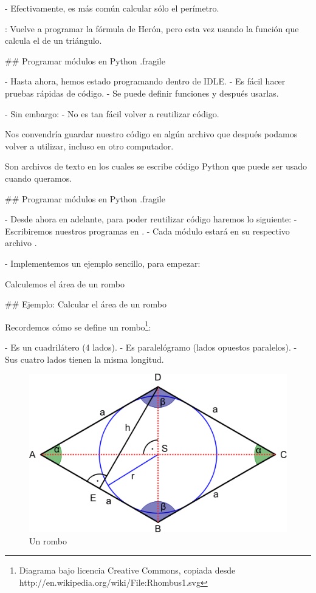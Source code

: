 \pause

- Efectivamente, es más común calcular sólo el perímetro.

\bgnblockidea
{}: Vuelve a programar la fórmula de Herón, pero esta vez usando la función
que calcula el  de un triángulo.
\trmblockidea

## Programar módulos en Python {.fragile}

- Hasta ahora, hemos estado programando dentro de IDLE.
    - Es fácil hacer pruebas rápidas de código.
    - Se puede definir funciones y después usarlas.

- Sin embargo:
    - No es tan fácil volver a reutilizar código.

\pause

\bgnblockidea
Nos convendría guardar nuestro código en algún archivo que después podamos volver a utilizar, incluso en
otro computador.
\trmblockidea

\pause

\bgnblockdefinition
{} Son archivos de texto en los cuales se escribe código Python que puede ser usado
cuando queramos.
\trmblockdefinition

## Programar módulos en Python {.fragile}

- Desde ahora en adelante, para poder reutilizar código haremos lo siguiente:
    - Escribiremos nuestros programas en .
    - Cada módulo estará en su respectivo archivo .

- Implementemos un ejemplo sencillo, para empezar:

\bgnblocknormal
Calculemos el área de un rombo
\trmblocknormal


## Ejemplo: Calcular el área de un rombo

Recordemos cómo se define un rombo\footnote{\tiny{Diagrama bajo licencia Creative Commons, copiada desde http://en.wikipedia.org/wiki/File:Rhombus1.svg}}:

- Es un cuadrilátero (4 lados).
- Es paralelógramo (lados opuestos paralelos).
- Sus cuatro lados tienen la misma longitud.

\vspace{4mm}

\begin{center}
    \begin{figure}
    \includegraphics[width=.5\textwidth]{img/rhombus-500px.png}
    \caption{Un rombo}
    \end{figure}
\end{center}


